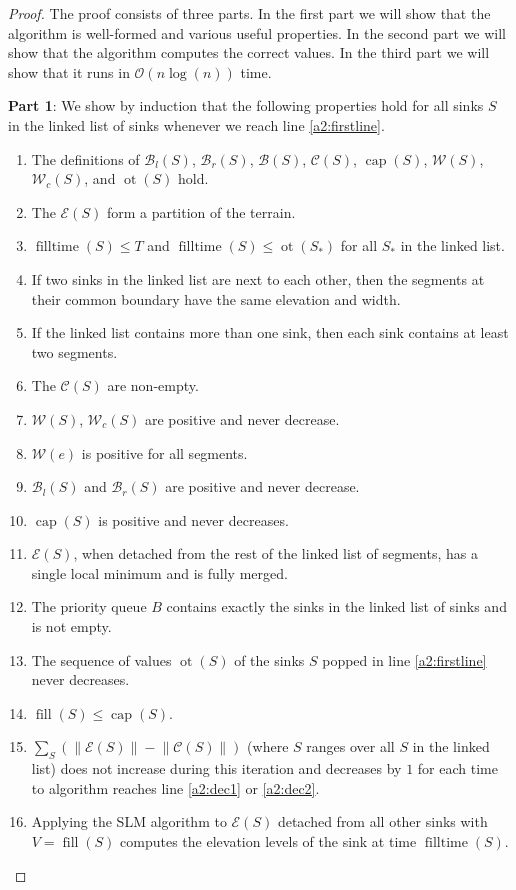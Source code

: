 \documentclass[11pt,a4paper]{article}
\newcommand{\norm}[1]{\left\lVert #1 \right\rVert}
\newcommand{\bO}{\mathcal{O}}
\newcommand{\Br}{\mathcal{B}_r}
\newcommand{\Bl}{\mathcal{B}_l}
\newcommand{\B}{\mathcal{B}}
\newcommand{\Wc}{\mathcal{W}_c}
\newcommand{\W}{\mathcal{W}}
\newcommand{\C}{\mathcal{C}}
\newcommand{\E}{\mathcal{E}}
\DeclareMathOperator{\capp}{cap}
\DeclareMathOperator{\ot}{ot}
\DeclareMathOperator{\Fill}{fill}
\DeclareMathOperator{\filltime}{filltime}
\begin{document}
\begin{proof}
The proof consists of three parts.
In the first part we will show that the algorithm is well-formed and various useful properties.
In the second part we will show that the algorithm computes the correct values.
In the third part we will show that it runs in $\bO(n\log(n))$ time.

\textbf{Part 1}:
We show by induction that the following properties hold for all sinks $S$ in the linked list of sinks whenever we reach line \ref{a2:firstline}.
\begin{enumerate}[label=\textbf{\Roman*}]
\item The definitions of $\Bl(S)$, $\Br(S)$, $\B(S)$, $\C(S)$, $\capp(S)$, $\W(S)$, $\Wc(S)$, and $\ot(S)$ hold.\label{e1}
\item The $\E(S)$ form a partition of the terrain.\label{e2}
\item $\filltime(S) \le T$ and $\filltime(S) \le \ot(S_*)$ for all $S_*$ in the linked list.\label{e3}
\item If two sinks in the linked list are next to each other, then the segments at their common boundary have the same elevation and width.\label{e4} 
\item If the linked list contains more than one sink, then each sink contains at least two segments.\label{e6}
\item The $\C(S)$ are non-empty.\label{e7}
\item $\W(S)$, $\Wc(S)$ are positive and never decrease.\label{e8}
\item $\W(e)$ is positive for all segments.\label{e9}
\item $\Bl(S)$ and $\Br(S)$ are positive and never decrease.\label{e10}
\item $\capp(S)$ is positive and never decreases.\label{e11}
\item $\E(S)$, when detached from the rest of the linked list of segments, has a single local minimum and is fully merged.\label{e12}
\item The priority queue $B$ contains exactly the sinks in the linked list of sinks and is not empty.\label{e13}
\item The sequence of values $\ot(S)$ of the sinks $S$ popped in line \ref{a2:firstline} never decreases.\label{e15}
\item $\Fill(S) \le \capp(S)$.\label{e16}
\item $\sum_S\left(\norm{\E(S)} - \norm{\C(S)}\right)$ (where $S$ ranges over all $S$ in the linked list) does not increase during this iteration and decreases by $1$ for each time to algorithm reaches line \ref{a2:dec1} or \ref{a2:dec2}.\label{e17}
\item Applying the SLM algorithm to $\E(S)$ detached from all other sinks with $V=\Fill(S)$ computes the elevation levels of the sink at time $\filltime(S)$.\label{e18}
\end{enumerate}


\end{proof}
\end{document}
